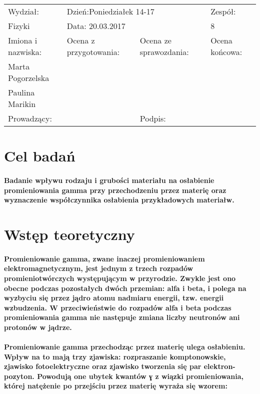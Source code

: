 \documentclass[a4paper,10pt]{article}
\def\arraystretch{1.2}
\begin{document}
\begin{table}
  \centering
  \def\arraystretch{1.5}
    \begin{tabular}{|l|l|l|l|} \hline
    Wydział:           & \multicolumn{2}{l|}{Dzień:Poniedziałek 14-17}    &Zespół:  \\
    Fizyki             &    \multicolumn{2}{l|}{Data: 20.03.2017}         &8             \\\hline
    Imiona i nazwiska: &Ocena z przygotowania:  &Ocena ze sprawozdania:   &Ocena końcowa: \\
    Marta Pogorzelska  &                        &                         &                \\
    Paulina Marikin    &                        &                         &\\\hline
    \multicolumn{2}{|l|}{Prowadzący:                 } &\multicolumn{2}{l|}{Podpis:             }  \\\hline
  \end{tabular}
\end{table}

\section{Cel badań}
\paragraph{Badanie wpływu rodzaju i grubości materiału na osłabienie
promieniowania gamma przy przechodzeniu przez materię oraz wyznaczenie współczynnika osłabienia przykładowych materiałw.}

\section{Wstęp teoretyczny}
\paragraph{Promieniowanie gamma, zwane inaczej promieniowaniem elektromagnetycznym,
jest jednym z trzech rozpadów promieniotwórczych występującym w przyrodzie.
Zwykle jest ono obecne podczas pozostałych dwóch przemian: alfa i beta, i polega
na wyzbyciu się przez jądro atomu nadmiaru energii, tzw. energii wzbudzenia.
W przeciwieństwie do rozpadów alfa i beta podczas promieniowania gamma nie następuje zmiana liczby neutronów ani protonów  w jądrze.}
\paragraph{Promieniowanie gamma przechodząc przez materię ulega osłabieniu.
Wpływ na to mają trzy zjawiska: rozpraszanie komptonowskie, zjawisko fotoelektryczne
oraz zjawisko tworzenia się par elektron-pozyton. Powodują one ubytek kwantów ɣ z
wiązki promieniowania, której natężenie po przejściu przez materię wyraża się wzorem:}
\end{document}
